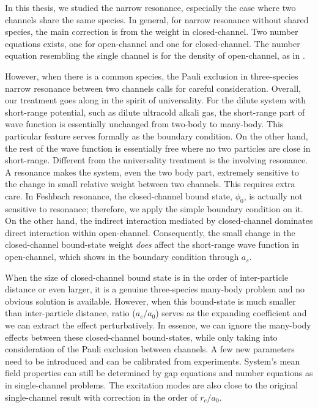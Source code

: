 % 
In this thesis, we studied the narrow resonance, especially the case where two channels share the same species.  In general, for narrow resonance without shared species, the main correction is from the weight in closed-channel.  Two number equations exists, one for open-channel and one for closed-channel.  The number equation resembling the single channel is for the density of open-channel, as in  \cite{GurarieNarrow}.  

However, when there is a common species,  the Pauli exclusion in three-species narrow resonance between two channels calls for careful  consideration.  Overall, our treatment goes along in the spirit of universality.  For the dilute system with short-range potential, such as dilute ultracold alkali gas, the short-range part of  wave function is essentially unchanged from two-body  to many-body.  This particular feature serves formally as the boundary condition.  On the other hand, the rest of the wave function is essentially free where no two particles are close in short-range.  Different from the universality treatment is the involving resonance. A resonance makes the system, even the two body part, extremely sensitive to the change in small relative weight between two channels.  This  requires extra care.  In Feshbach resonance, the closed-channel bound state, $\phi_{0}$,  is actually not sensitive to resonance; therefore, we apply the simple boundary condition on it. On the other hand, the indirect interaction mediated by closed-channel dominates direct interaction within open-channel. Consequently, the small change in the closed-channel bound-state weight \emph{does} affect the short-range wave function in open-channel, which shows in the boundary condition through $a_{s}$. 

When the size of  closed-channel bound state is in the order of   inter-particle distance or even larger, it is a genuine three-species many-body problem and no obvious solution is available.  However, when this bound-state is much smaller than inter-particle distance, ratio ($a_{c}/a_{0}$) serves as the expanding coefficient and we can extract  the effect perturbatively.  In essence, we can ignore the many-body effects between these closed-channel bound-states, while only taking into consideration of the Pauli exclusion between channels.  A few new parameters need to be introduced and can be calibrated from experiments.  System's mean field properties can still be determined by gap equations and number equations as in single-channel problems.  The excitation modes are also close to the original single-channel result with correction in the order of $r_{c}/a_{0}$.

